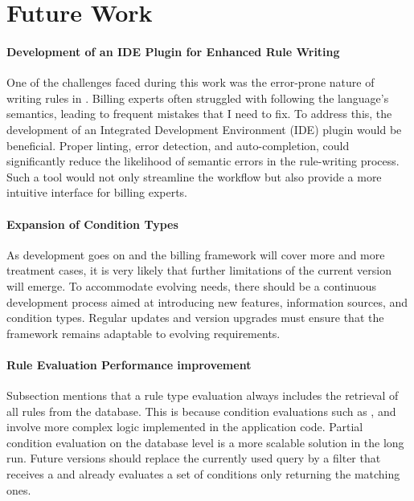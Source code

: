\section{Future Work}\label{sec:future-work}

\paragraph{Development of an IDE Plugin for Enhanced Rule Writing}
One of the challenges faced during this work was the error-prone nature of writing rules in \RF.
Billing experts often struggled with following the language's semantics, leading to frequent mistakes that I need to fix.
To address this, the development of an Integrated Development Environment (IDE) plugin would be beneficial.
Proper linting, error detection, and  auto-completion, could significantly reduce the likelihood of semantic errors
in the rule-writing process.
Such a tool would not only streamline the workflow but also provide a more intuitive interface for billing experts.

\paragraph{Expansion of Condition Types}
As development goes on and the billing framework will cover more and more treatment cases,
it is very likely that further limitations of the current version will emerge.
To accommodate evolving needs, there should be a continuous development process aimed at introducing new features,
information sources, and condition types.
Regular updates and version upgrades must ensure that the framework remains adaptable to evolving requirements.

\paragraph{Rule Evaluation Performance improvement}
Subsection \label{subsec:initial-goä-rule-evalutation} mentions that a rule type evaluation always includes the retrieval of all rules from the database.
This is because condition evaluations such as \anamnesisBlocks, \physicalBlocks and \requiredIcdCodes involve more complex logic implemented in the application code.
Partial condition evaluation on the database level is a more scalable solution in the long run.
Future versions should replace the currently used  query by a filter that receives a \REI and already evaluates a set of conditions only returning the matching ones.

